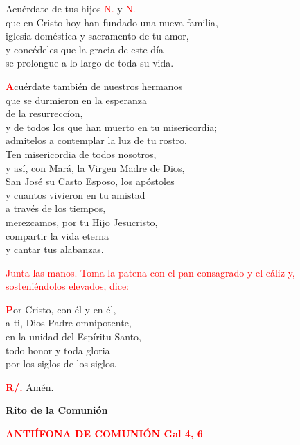 \documentclass[12pt, letterpaper]{report}
\begin{document}
  Acu\'erdate de tus hijos \textcolor{red}{N.} y \textcolor{red}{N.} \\
  que en Cristo hoy han fundado una nueva familia, \\
  iglesia dom\'estica y sacramento de tu amor, \\
  y conc\'edeles que la gracia de este d\'ia \\
  se prolongue a lo largo de toda su vida.

  \lettrine[lines=2]{\bfseries \textcolor{red}{A}}{}cu\'erdate tambi\'en de nuestros hermanos\\
  que se durmieron en la esperanza\\
  de la resurrecc\'ion,\\
  y de todos los que han muerto en tu misericordia;\\
  admitelos a contemplar la luz de tu rostro.\\
  Ten misericordia de todos nosotros,\\
  y as\'i, con Mar\'a, la Virgen Madre de Dios,\\
  San Jos\'e su Casto Esposo, los ap\'ostoles\\
  y cuantos vivieron en tu amistad\\
  a trav\'es de los tiempos,\\
  merezcamos, por tu Hijo Jesucristo,\\
  compartir la vida eterna\\
  y cantar tus alabanzas.

  \large{\textcolor{red}{Junta las manos. Toma la patena con el pan consagrado y el c\'aliz y, sosteni\'endolos elevados, dice:}}

  \lettrine[lines=2]{\bfseries \textcolor{red}{P}}{}or Cristo, con \'el y en \'el,\\
  a ti, Dios Padre omnipotente,\\
  en la unidad del Esp\'iritu Santo,\\
  todo honor y toda gloria\\
  por los siglos de los siglos.

  \noindent
  \Large {\bfseries \textcolor{red}{R/.}} \hspace{0.5cm} Am\'en.

  \begin{center}
    \Huge {\bfseries Rito de la Comuni\'on}
  \end{center}

  \Large {\bfseries \textcolor{red}{ANTI\'IFONA DE COMUNI\'ON \hspace{2cm} \large Gal 4, 6}}
\end{document}
